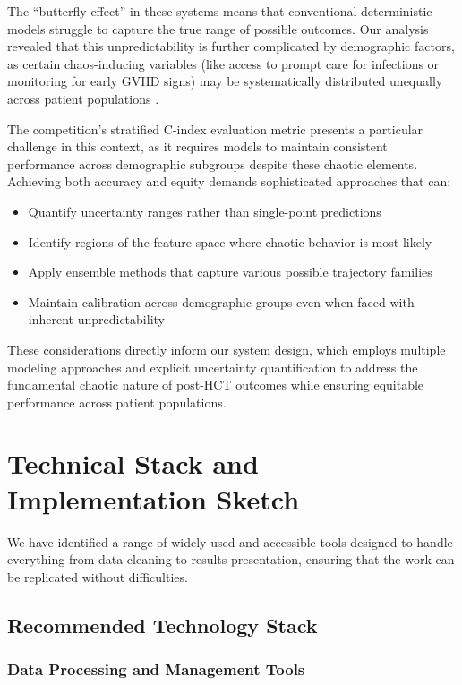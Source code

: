 The ``butterfly effect'' in these systems means that conventional deterministic models struggle to capture the true range of possible outcomes. Our analysis revealed that this unpredictability is further complicated by demographic factors, as certain chaos-inducing variables (like access to prompt care for infections or monitoring for early GVHD signs) may be systematically distributed unequally across patient populations \cite{jama_ai_medicine}.

The competition's stratified C-index evaluation metric \cite{kaggle_competition} presents a particular challenge in this context, as it requires models to maintain consistent performance across demographic subgroups despite these chaotic elements. Achieving both accuracy and equity demands sophisticated approaches that can:

\begin{itemize}
    \item Quantify uncertainty ranges rather than single-point predictions
    \item Identify regions of the feature space where chaotic behavior is most likely
    \item Apply ensemble methods that capture various possible trajectory families
    \item Maintain calibration across demographic groups even when faced with inherent unpredictability
\end{itemize}

These considerations directly inform our system design, which employs multiple modeling approaches and explicit uncertainty quantification to address the fundamental chaotic nature of post-HCT outcomes while ensuring equitable performance across patient populations.

\section{Technical Stack and Implementation Sketch}

We have identified a range of widely-used and accessible tools designed to handle everything from data cleaning to results presentation, ensuring that the work can be replicated without difficulties.

\subsection{Recommended Technology Stack}

\subsubsection{Data Processing and Management Tools}

